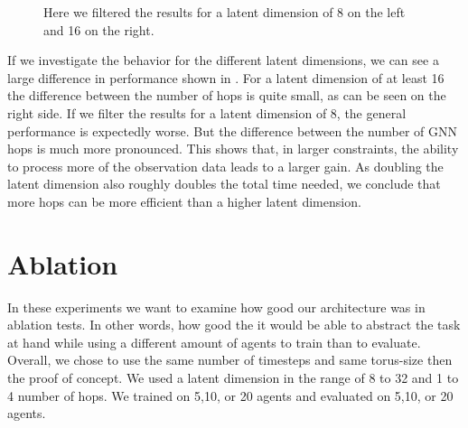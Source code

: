 \begin{figure}[htp]
    \centering
    \hspace{1cm}                       
    \caption{Here we filtered the results for a latent dimension of 8 on the left and 16 on the right.}
    \label{fig:proof_of_concept_rendezvous_ld}
\end{figure}

If we investigate the behavior for the different latent dimensions, we can see a large difference in performance shown in . For a latent dimension of at least 16 the difference between the number of hops is quite small, as can be seen on the right side. If we filter the results for a latent dimension of 8, the general performance is expectedly worse. But the difference between the number of GNN hops is much more pronounced. This shows that, in larger constraints, the ability to process more of the observation data leads to a larger gain. As doubling the latent dimension also roughly doubles the total time needed, we conclude that more hops can be more efficient than a higher latent dimension.


\section{Ablation}
\label{sec:Ablation}
In these experiments we want to examine how good our architecture was in ablation tests. In other words, how good the it would be able to abstract the task at hand while using a different amount of agents to train than to evaluate. Overall, we chose to use the same number of timesteps and same torus-size then the proof of concept. We used a latent dimension in the range of 8 to 32 and 1 to 4 number of hops. We trained on 5,10, or 20 agents and evaluated on 5,10, or 20 agents.

